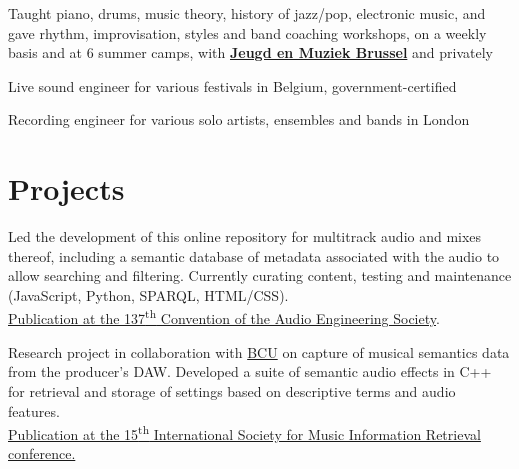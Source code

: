 \documentclass[letterpaper]{deedy-resume} %
\begin{document}
{\begin{minipage}[t]{0.66\textwidth}
\hspace{-0.1cm}
\begin{tightitemize}
\item Taught piano, drums, music theory, history of jazz/pop, electronic music, and gave rhythm, improvisation, styles and band coaching workshops, on a weekly basis and at 6 summer camps, with \href{http://www.jeugdenmuziekbrussel.be}{\textbf{Jeugd en Muziek Brussel}} and privately
\item Live sound engineer for various festivals in Belgium, government-certified
\item Recording engineer for various solo artists, ensembles and bands in London
\end{tightitemize}



\section{Projects}

\hspace{-0.1cm}

Led the development of this online repository for multitrack audio and mixes thereof, including a semantic database of metadata associated with the audio to allow searching and filtering. 
Currently curating content, testing and maintenance (JavaScript, Python, SPARQL, HTML/CSS).\\
\href{http://www.brechtdeman.com/downloads/aes137.pdf}{Publication at the 137\textsuperscript{th} Convention of the Audio Engineering Society}. 

\sectionspace %


\hspace{-0.1cm}
Research project in collaboration with \href{http://www.bcu.ac.uk}{BCU} on capture of musical semantics data from the producer's DAW. 
Developed a suite of semantic audio effects in C++ for retrieval and storage of settings based on descriptive terms and audio features. \\
\href{http://www.terasoft.com.tw/conf/ismir2014/LBD/LBD15.pdf}{Publication at the 15\textsuperscript{th} International Society for Music Information Retrieval conference.}


\end{minipage}}
\end{document}
